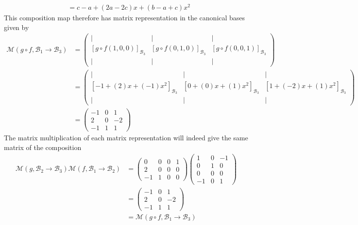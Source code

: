 {\begin{align*}
&= c-a + (2a-2c)x + (b-a+c)x^2
\end{align*}
This composition map therefore has matrix representation in the canonical bases given by
\begin{align*}
\mathcal{M}(g \circ f,\mathcal{B}_1 \to \mathcal{B}_3)
&=
\begin{pmatrix}
| & | & | \\
[g \circ f(1,0,0)]_{\mathcal{B}_3} & [g \circ f(0,1,0)]_{\mathcal{B}_3} & [g \circ f(0,0,1)]_{\mathcal{B}_3}\\
| & | & | 
\end{pmatrix} \\
&=
\begin{pmatrix}
| & | & | \\
  \left[-1 +  (2)x + (-1)x^2\right]_{\mathcal{B}_3} 
& \left[ 0 +  (0)x +  (1)x^2\right]_{\mathcal{B}_3} 
& \left[ 1 + (-2)x +  (1)x^2\right]_{\mathcal{B}_3}\\
| & | & | 
\end{pmatrix}  \\
&=
\begin{pmatrix}
 -1 & 0 &  1 \\
  2 & 0 & -2 \\
 -1 & 1 &  1
\end{pmatrix} 
\end{align*}
The matrix multiplication of each matrix representation will indeed give the same matrix of the composition
\begin{align*}
\mathcal{M}(g,\mathcal{B}_2\to\mathcal{B}_3)\mathcal{M}(f,\mathcal{B}_1\to\mathcal{B}_2) & = 
\begin{pmatrix}
  0 & 0 & 0 & 1 \\
  2 & 0 & 0 & 0 \\
 -1 & 1 & 0 & 0
\end{pmatrix}
\begin{pmatrix}
  1 & 0 & -1 \\
  0 & 1 &  0 \\
  0 & 0 &  0 \\
 -1 & 0 &  1
\end{pmatrix}  \\
&= 
\begin{pmatrix}
 -1 & 0 &  1 \\
  2 & 0 & -2 \\
 -1 & 1 &  1
\end{pmatrix}  \\
&= 
\mathcal{M}(g \circ f,\mathcal{B}_1 \to \mathcal{B}_3)
\end{align*}
}

